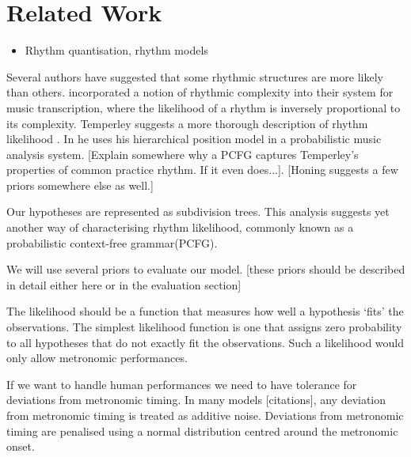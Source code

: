 \chapter{Related Work}
\label{sec:relatedwork}

\begin{itemize}
\item Rhythm quantisation, rhythm models
\end{itemize}


Several authors have suggested that some rhythmic structures are more likely than others. \cite{cemgil2000rhythm} incorporated a notion of rhythmic complexity into their system for music transcription, where the likelihood of a rhythm is inversely proportional to its complexity. Temperley suggests a more thorough description of rhythm likelihood \citep{temperley2010modeling}. In \cite{temperley2009unified} he uses his hierarchical position model in a probabilistic music analysis system. [Explain somewhere why a PCFG captures Temperley's properties of common practice rhythm. If it even does...]. [Honing suggests a few priors somewhere else as well.]

Our hypotheses are represented as subdivision trees. This analysis suggests yet another way of characterising rhythm likelihood, commonly known as a probabilistic context-free grammar(PCFG). 

We will use several priors to evaluate our model. [these priors should be described in detail either here or in the evaluation section]

The likelihood should be a function that measures how well a hypothesis `fits' the observations. The simplest likelihood function is one that assigns zero probability to all hypotheses that do not exactly fit the observations. Such a likelihood would only allow metronomic performances. 

If we want to handle human performances we need to have tolerance for deviations from metronomic timing. In many models [citations], any deviation from metronomic timing is treated as additive noise. Deviations from metronomic timing are penalised using a normal distribution centred around the metronomic onset.
